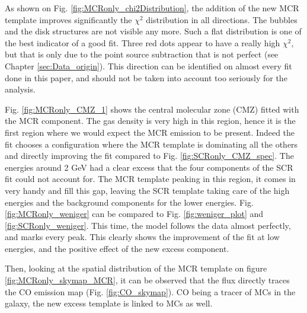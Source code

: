 
As shown on Fig. \ref{fig:MCRonly_chi2Distribution}, the addition of the new MCR template improves significantly the $\chi^2$ distribution in all directions. The bubbles and the disk structures are not visible any more. Such a flat distribution is one of the best indicator of a good fit.
Three red dots appear to have a really high $\chi^2$, but that is only due to the point source subtraction that is not perfect (see Chapter \ref{sec:Data_origin}). This direction can be identified on almost every fit done in this paper, and should not be taken into account too seriously for the analysis.

Fig. \ref{fig:MCRonly_CMZ_1} shows the central molecular zone (CMZ) fitted with the MCR component. The gas density is very high in this region, hence it is the first region where we would expect the MCR emission to be present.
Indeed the fit chooses a configuration where the MCR template is dominating all the others and directly improving the fit compared to Fig. \ref{fig:SCRonly_CMZ_spec}. The energies around 2 GeV had a clear excess that the four components of the SCR fit could not account for. The MCR template peaking in this region, it comes in very handy and fill this gap, leaving the SCR template taking care of the high energies and the background components for the lower energies.
Fig. \ref{fig:MCRonly_weniger} can be compared to Fig. \ref{fig:weniger_plot} and \ref{fig:SCRonly_weniger}. This time, the model follows the data almost perfectly, and marks every peak. This clearly shows the improvement of the fit at low energies, and the positive effect of the new excess component.

Then, looking at the spatial distribution of the MCR template on figure \ref{fig:MCRonly_skymap_MCR}, it can be observed that the flux directly traces the CO emission map (Fig. \ref{fig:CO_skymap}). CO being a tracer of MCs in the galaxy, the new excess template is linked to MCs as well.

